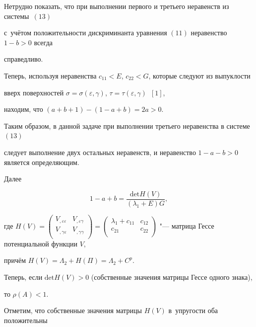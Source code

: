 Нетрудно показать, что при выполнении первого и третьего неравенств из системы~$(13)$

с~учётом положительности дискриминанта уравнения $(11)$ неравенство $1-b>0$  всегда

справедливо.

Теперь, используя неравенства \mbox{$c_{11}<E$}, $c_{22}<G$, которые следуют из выпуклости

вверх поверхностей $\sigma=\sigma(\varepsilon, \gamma)$, $\tau=\tau(\varepsilon, \gamma)$~$[1]$,

находим, что $(a+b+1)-(1-a+b)=2a>0$.

Таким образом, в данной задаче при выполнении третьего неравенства в системе~$(13)$

следует выполнение двух остальных неравенств, и неравенство $1-a-b>0$ является определяющим.



Далее

$$

1-a+b=\displaystyle\frac{\text{det} H(V)}{\left(\lambda_1+E\right)G},

$$

где $H(V)=\left (

 \begin{array}{cc}

         V_{,\varepsilon\varepsilon} & V_{,\varepsilon\gamma}\\

         V_{,\gamma\varepsilon} & V_{,\gamma\gamma}\\

 \end{array}

 \right)=\left (

 \begin{array}{cc}

         \lambda_1+c_{11} & c_{12}\\

         c_{21} & c_{22}\\

 \end{array}

 \right)$ "--- матрица Гессе потенциальной функции $V$,

причём $H(V)=\Lambda_2+H(\Pi)=\Lambda_2+C^p$.

Теперь, если $\text{det} H(V)>0$ (собственные значения матрицы Гессе одного знака),

то $\rho(A)<1$.

Отметим, что собственные значения матрицы $H(V)$ в~упругости оба положительны

